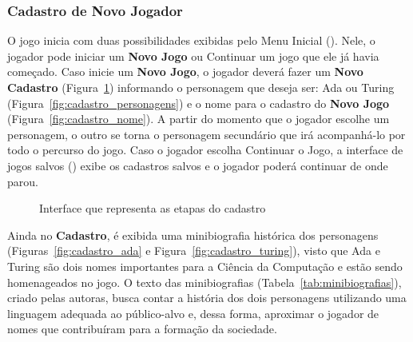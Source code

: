 \subsubsection{Cadastro de Novo Jogador} \label{sssec:cadastro}

O jogo inicia com duas possibilidades exibidas pelo Menu Inicial (). Nele, o jogador pode iniciar um \textbf{Novo Jogo} ou Continuar um jogo que ele já havia começado. Caso inicie um \textbf{Novo Jogo}, o jogador deverá fazer um \textbf{Novo Cadastro} (Figura~\ref{fig:cadastro}) informando o personagem que deseja ser: Ada ou Turing (Figura~\ref{fig:cadastro_personagens}) e o nome para o cadastro do \textbf{Novo Jogo} (Figura~\ref{fig:cadastro_nome}). A partir do momento que o jogador escolhe um personagem, o outro se torna o personagem secundário que irá acompanhá-lo por todo o percurso do jogo. Caso o jogador escolha Continuar o Jogo, a interface de jogos salvos () exibe os cadastros salvos e o jogador poderá continuar de onde parou.


\begin{figure}[H]
\centering
{}
\quad %
\quad %
\quad %
\caption{Interface que representa as etapas do cadastro}
\label{fig:cadastro}
\end{figure}


Ainda no \textbf{Cadastro}, é exibida uma minibiografia histórica dos personagens (Figuras~\ref{fig:cadastro_ada} e Figura~\ref{fig:cadastro_turing}), visto que Ada e Turing são dois nomes importantes para a Ciência da Computação e estão sendo homenageados no jogo. O texto das minibiografias (Tabela~\ref{tab:minibiografias}), criado pelas autoras, busca contar a história dos dois personagens utilizando uma linguagem adequada ao público-alvo e, dessa forma, aproximar o jogador de nomes que contribuíram para a formação da sociedade.

